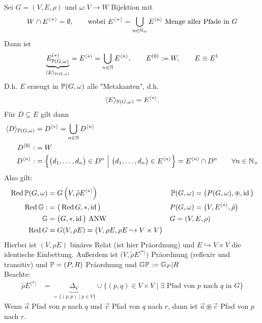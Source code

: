 \begin{lemma}
	Sei $G=(V,E,\rho)$ und $\omega:V\to W$ Bijektion mit 
	\begin{align*}
		W\cap E^{\langle+\rangle}=\emptyset,\qquad\text{wobei }
		E^{\langle +\rangle}=\bigcup_{n\in\N_+}E^{\langle n\rangle}\text{ Menge aller Pfade in }G
	\end{align*}
	Dann ist
	\begin{align*}
		\underbrace{E^{(\ast)}_{\P(G,\omega)}}_{\langle E\rangle_{\P(G,\omega)}}=E^{\langle\ast\rangle}=\bigcup\limits_{n\in\N} E^{\langle n\rangle},\qquad E^{(0)}:=W,\qquad
		E\equiv E^1
	\end{align*}
	D.h. $E$ erzeugt in $\P(G,\omega)$ alle "Metakanten", d.h.
	\begin{align*}
		\langle E\rangle_{\P(G,\omega)}=E^{\langle\ast\rangle}.
	\end{align*}
	Für $D\subseteq E$ gilt dann 
	\begin{align*}
		\langle D\rangle_{\P(G,\omega)}&=D^{\langle\ast\rangle}=\bigcup\limits_{n\in\N} D^{\langle n\rangle}\\
		D^{\langle0\rangle}:&=W\\
		D^{\langle n\rangle}:&=\left\lbrace\big(d_1,\ldots,d_n\big)\in D^n~\Big|~\big(d_1,\ldots,d_n\big)\in E^{\langle n\rangle}\right\rbrace=E^{\langle n\rangle}\cap D^n\qquad\forall n\in\N_+
	\end{align*}
	Also gilt:
	\begin{align*}
		\Red\P(G,\omega)&=G\left(V,\tilde{\rho} E^{\langle\ast\rangle}\right) &\P&(G,\omega)=\big(P(G,\omega),\circledast,\id\big)\\
		\Red \G:&=\big(\Red G,\ast,\id\big) &P&(G,\omega)=\big(V,E^{\langle\ast\rangle},\tilde{\rho}\big)\\
		\mathbb{G}&=\big(G,\ast,\id\big)\text{ ANW} &G&=(V,E,\rho)\\
		\Red G&=G(V,\rho E)=\big(V,\rho E,\rho E\hookrightarrow V\times V\big)
	\end{align*}
	Hierbei ist $(V,\rho E)$ binäres Relat (ist hier Präordnung) und $E\hookrightarrow V\times V$ die identische Einbettung. Außerdem ist $\big(V,\tilde{\rho}E^{\langle\ast\rangle}\big)$ Präordnung (reflexiv und transitiv) und $\P=(P,R)$ Präordnung und $\mathbb{G}\P:=\mathbb{G}_P|R$\\
	Beachte:
	\begin{align*}
		\tilde{\rho} E^{\langle\ast\rangle}&=\underbrace{\Delta_V}_{=\lbrace(p,p)\mid p\in V\rbrace}\cup\big\lbrace(p,q)\in V\times V\mid\exists\text{ Pfad von $p$ nach $q$ in }G\big\rbrace
	\end{align*}
	Wenn $\vec{a}$ Pfad von $p$ nach $q$ und $\vec{c}$ Pfad von $q$ nach $r$, dann ist $\vec{a}\circledast\vec{c}$ Pfad von $p$ nach $r$.
\end{lemma}

